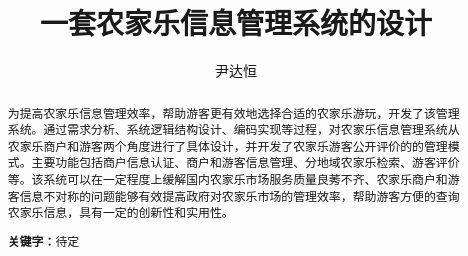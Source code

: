 \documentclass[]{article}
\title{一套农家乐信息管理系统的设计}
\author{尹达恒}
\begin{document}
	\maketitle
	\newpage
	\begin{abstract}
		为提高农家乐信息管理效率，帮助游客更有效地选择合适的农家乐游玩，开发了该管理系统。通过需求分析、系统逻辑结构设计、编码实现等过程，对农家乐信息管理系统从农家乐商户和游客两个角度进行了具体设计，并开发了农家乐游客公开评价的的管理模式。主要功能包括商户信息认证、商户和游客信息管理、分地域农家乐检索、游客评价等。该系统可以在一定程度上缓解国内农家乐市场服务质量良莠不齐、农家乐商户和游客信息不对称的问题能够有效提高政府对农家乐市场的管理效率，帮助游客方便的查询农家乐信息，具有一定的创新性和实用性。
		
		\textbf{关键字：}待定
	\end{abstract}
	\newpage
	\tableofcontents
	\newpage
\end{document}
